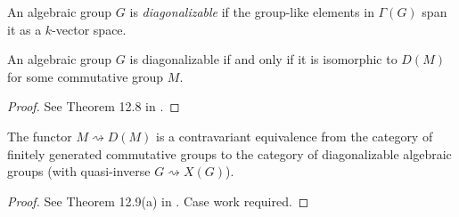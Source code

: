 \begin{definition}
  \label{diag}
  An algebraic group $G$ is \emph{diagonalizable}
  if the group-like elements in $\Gamma(G)$ span it as a $k$-vector space.
\end{definition}

\begin{theorem}
  \label{diag_iff_D}
  An algebraic group $G$ is diagonalizable
  if and only if it is isomorphic to $D(M)$ for some commutative group $M$.
\end{theorem}
\begin{proof}
  See Theorem 12.8 in \cite{Milne_2017}.
\end{proof}

\begin{theorem}
  \label{congr_fggrp_diag}
  The functor $M\rightsquigarrow D(M)$ is a contravariant equivalence
  from the category of finitely generated commutative groups to the category of
  diagonalizable algebraic groups (with quasi-inverse $G \rightsquigarrow X(G)$).
\end{theorem}
\begin{proof}
  See Theorem 12.9(a) in \cite{Milne_2017}. Case work required.
\end{proof}
